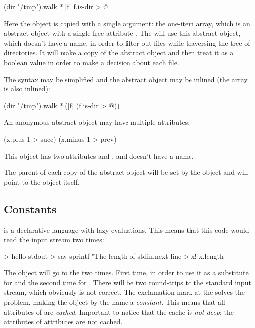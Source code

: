 \begin{ffcode}
(dir "/tmp").walk
  *
    [f]
      f.is-dir > @
\end{ffcode}

Here the object  is copied with a single argument:
the one-item array, which is an
abstract object with a single free attribute . The 
will use this abstract object, which doesn't have a name, in order
to filter out files while traversing the tree of directories. It will
make a copy of the abstract object and then treat it as a boolean
value in order to make a decision about each file.

The syntax may be simplified and the abstract object may be inlined
(the array is also inlined):

\begin{ffcode}
(dir "/tmp").walk
  * ([f] (f.is-dir > @))
\end{ffcode}

An anonymous abstract object may have multiple attributes:

\begin{ffcode}
[x] (x.plus 1 > succ) (x.minus 1 > prev)
\end{ffcode}

This object has two attributes  and , and doesn't
have a name.

The parent of each copy of the abstract object will be set by
the object  and will point to the  object itself.

\subsection{Constants}

\eo{} is a declarative language with lazy evaluations. This means
that this code would read the input stream two times:

\begin{ffcode}
[] > hello
  stdout > say
    sprintf
      "The length of %
      stdin.next-line > x!
      x.length
\end{ffcode}

The  object will go to the  two times. First time,
in order to use it as a substitute for  and the second time for
. There will be two round-trips to the standard input stream, which
obviously is not correct. The exclamation mark at the  solves the
problem, making the object by the name  a \emph{constant}. This means
that all attributes of  are \emph{cached}. Important to notice
that the cache is \emph{not deep}: the attributes of attributes are not cached.

